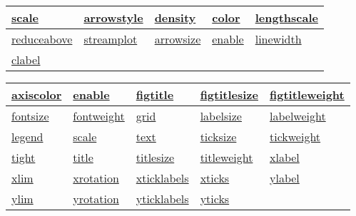 \begin{table}
    \centering
    \label{tab:windfmt_keys}
    \begin{tabular}{|p{}|p{}|p{}|p{}|p{}|}
        \hline
        \hyperref[item:scale]{scale}             & \hyperref[item:arrowstyle]{arrowstyle}   & \hyperref[item:density]{density}         & \hyperref[item:color]{color}             & \hyperref[item:lengthscale]{lengthscale} \\
        \hline
        \hyperref[item:reduceabove]{reduceabove} & \hyperref[item:streamplot]{streamplot}   & \hyperref[item:arrowsize]{arrowsize}     & \hyperref[item:enable]{enable}           & \hyperref[item:linewidth]{linewidth}     \\
        \hline
        \hyperref[item:clabel]{clabel}           &  &  &  &  \\
        \hline
    \end{tabular}
\end{table}
\begin{table}
    \centering
    \label{tab:simplefmt_keys}
    \begin{tabular}{|p{}|p{}|p{}|p{}|p{}|}
        \hline
        \hyperref[item:axiscolor]{axiscolor}           & \hyperref[item:enable]{enable}                 & \hyperref[item:figtitle]{figtitle}             & \hyperref[item:figtitlesize]{figtitlesize}     & \hyperref[item:figtitleweight]{figtitleweight} \\
        \hline
        \hyperref[item:fontsize]{fontsize}             & \hyperref[item:fontweight]{fontweight}         & \hyperref[item:grid]{grid}                     & \hyperref[item:labelsize]{labelsize}           & \hyperref[item:labelweight]{labelweight}       \\
        \hline
        \hyperref[item:legend]{legend}                 & \hyperref[item:scale]{scale}                   & \hyperref[item:text]{text}                     & \hyperref[item:ticksize]{ticksize}             & \hyperref[item:tickweight]{tickweight}         \\
        \hline
        \hyperref[item:tight]{tight}                   & \hyperref[item:title]{title}                   & \hyperref[item:titlesize]{titlesize}           & \hyperref[item:titleweight]{titleweight}       & \hyperref[item:xlabel]{xlabel}                 \\
        \hline
        \hyperref[item:xlim]{xlim}                     & \hyperref[item:xrotation]{xrotation}           & \hyperref[item:xticklabels]{xticklabels}       & \hyperref[item:xticks]{xticks}                 & \hyperref[item:ylabel]{ylabel}                 \\
        \hline
        \hyperref[item:ylim]{ylim}                     & \hyperref[item:yrotation]{yrotation}           & \hyperref[item:yticklabels]{yticklabels}       & \hyperref[item:yticks]{yticks}                 &  \\
        \hline
    \end{tabular}
\end{table}
